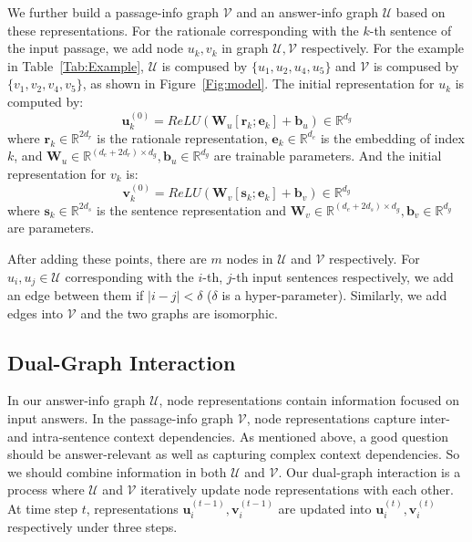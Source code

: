 \documentclass[11pt,a4paper]{article}
\begin{document}
We further build a passage-info graph $\mathcal{V}$ and an answer-info graph $\mathcal{U}$ based on these representations. 
For the rationale corresponding with the $k$-th sentence of the input passage, we add node $u_k, v_k$ in graph $\mathcal{U}, \mathcal{V}$ respectively. 
For the example in Table~\ref{Tab:Example}, $\mathcal{U}$ is compused by $\{u_1, u_2, u_4, u_5\}$ and $\mathcal{V}$ is compused by $\{v_1, v_2, v_4, v_5\}$, as shown in Figure~\ref{Fig:model}.
The initial representation for $u_k$ is computed by:
\begin{equation}
\bm{u}_k^{(0)} = ReLU(\bm{W}_u [\bm{r}_k; \bm{e}_k] + \bm{b}_u) \in \mathbb{R}^{d_g}
\end{equation}
where $\bm{r}_k \in \mathbb{R}^{2 d_r}$ is the rationale representation, $\bm{e}_k \in \mathbb{R}^{d_e}$ is the embedding of index $k$, and $\bm{W}_u \in \mathbb{R}^{(d_e + 2 d_r) \times d_g}, \bm{b}_u \in \mathbb{R}^{d_g}$ are trainable parameters. 
And the initial representation for $v_k$ is:
\begin{equation}
\bm{v}_k^{(0)} = ReLU(\bm{W}_v [\bm{s}_k; \bm{e}_k] + \bm{b}_v) \in \mathbb{R}^{d_g}
\end{equation}
where $\bm{s}_k \in \mathbb{R}^{2 d_s}$ is the sentence representation and $\bm{W}_v \in \mathbb{R}^{(d_e + 2 d_s) \times d_g}, \bm{b}_v \in \mathbb{R}^{d_g}$ are parameters.

After adding these points, there are $m$ nodes in $\mathcal{U}$ and $\mathcal{V}$ respectively. For $u_i, u_j \in \mathcal{U}$ corresponding with the $i$-th, $j$-th input sentences respectively, we add an edge between them if $|i-j| < \delta$ ($\delta$ is a hyper-parameter). Similarly, we add edges into $\mathcal{V}$ and the two graphs are isomorphic. 

\subsection{Dual-Graph Interaction}
In our answer-info graph $\mathcal{U}$, node representations contain information focused on input answers. In the passage-info graph $\mathcal{V}$, node representations capture inter- and intra-sentence context dependencies. 
As mentioned above, a good question should be answer-relevant as well as capturing complex context dependencies. So we should combine information in both $\mathcal{U}$ and $\mathcal{V}$. 
Our dual-graph interaction is a process where $\mathcal{U}$ and $\mathcal{V}$ iteratively update node representations with each other. At time step $t$, representations $\bm u_i^{(t-1)}, \bm v_i^{(t-1)}$ are updated into $\bm u_i^{(t)}, \bm v_i^{(t)}$ respectively under three steps.
\end{document}
